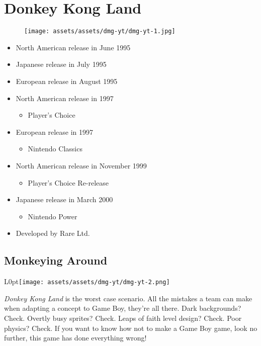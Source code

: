 \documentclass{book}
\begin{document}
\chapter*{Donkey Kong Land}
\vspace{\baselineskip}\begin{figure}[H]{\texttt{[image: assets/assets/dmg-yt/dmg-yt-1.jpg]}}\end{figure}\vspace{\baselineskip}
\begin{itemize}[left=0pt, nosep]
\item North American release in June 1995
\item Japanese release in July 1995
\item European release in August 1995
\item North American release in 1997
\begin{itemize}
\item Player’s Choice
\end{itemize}
\item European release in 1997
\begin{itemize}
\item Nintendo Classics
\end{itemize}
\item North American release in November 1999
\begin{itemize}
\item Player’s Choice Re-release
\end{itemize}
\item Japanese release in March 2000
\begin{itemize}
\item Nintendo Power
\end{itemize}
\item Developed by Rare Ltd.

\end{itemize}
\newpage\FloatBarrier\section*{Monkeying Around}
\begin{wrapfigure}{L}{0pt}{\texttt{[image: assets/assets/dmg-yt/dmg-yt-2.png]}}\end{wrapfigure}\noindent
\emph{Donkey Kong Land} is the worst case scenario. All the mistakes a team can make when adapting a concept to Game Boy, they’re all there. Dark backgrounds? Check. Overtly busy sprites? Check. Leaps of faith level design? Check. Poor physics? Check. If you want to know how not to make a Game Boy game, look no further, this game has done everything wrong!\par
\end{document}
